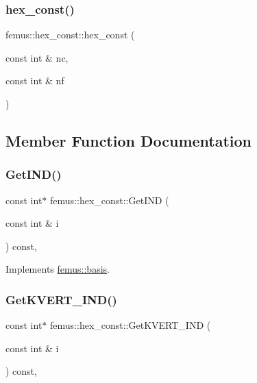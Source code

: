 \subsubsection{\texorpdfstring{hex\+\_\+const()}{hex\_const()}}
{\footnotesize\ttfamily femus\+::hex\+\_\+const\+::hex\+\_\+const (\begin{DoxyParamCaption}\item[{const int \&}]{nc,  }\item[{const int \&}]{nf }\end{DoxyParamCaption})\hspace{0.3cm}{\ttfamily [inline]}}



\subsection{Member Function Documentation}
\mbox{\label{classfemus_1_1hex__const_a8dba97c67c9c993a1eedabfd12aac809}} 
\subsubsection{\texorpdfstring{Get\+I\+N\+D()}{GetIND()}}
{\footnotesize\ttfamily const int$\ast$ femus\+::hex\+\_\+const\+::\+Get\+I\+ND (\begin{DoxyParamCaption}\item[{const int \&}]{i }\end{DoxyParamCaption}) const\hspace{0.3cm}{\ttfamily [inline]}, {\ttfamily [virtual]}}



Implements \mbox{\hyperlink{classfemus_1_1basis_a3f63ad97ce70cd4a1196ede69f1f144b}{femus\+::basis}}.

\mbox{\label{classfemus_1_1hex__const_a085fcb241d0ab952117945bcdd27215b}} 
\subsubsection{\texorpdfstring{Get\+K\+V\+E\+R\+T\+\_\+\+I\+N\+D()}{GetKVERT\_IND()}}
{\footnotesize\ttfamily const int$\ast$ femus\+::hex\+\_\+const\+::\+Get\+K\+V\+E\+R\+T\+\_\+\+I\+ND (\begin{DoxyParamCaption}\item[{const int \&}]{i }\end{DoxyParamCaption}) const\hspace{0.3cm}{\ttfamily [inline]}, {\ttfamily [virtual]}}



